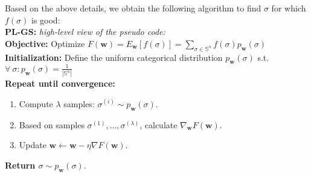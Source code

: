 \documentclass[a4paper,10pt]{article}
\begin{document}
	Based on the above details, we obtain the following algorithm to find $\sigma$ for which $f(\sigma)$ is good:\\
	\textbf{PL-GS:} \textit{high-level view of the pseudo code:} \\
	\textbf{Objective:} Optimize $F(\mathbf{w}) = E_\mathbf{w}[f(\sigma)] = \sum_{\sigma \in \mathbb{S}^n} f(\sigma) p_\mathbf{w}(\sigma)$ \\	
	\textbf{Initialization:} Define the uniform categorical distribution $p_\mathbf{w}(\sigma)$ s.t. $\forall~\sigma: p_\mathbf{w}(\sigma)=\frac{1}{|\mathbb{S}^n|}$ \\	
	\textbf{Repeat until convergence:}
	\begin{enumerate}
		\item Compute $\lambda$ samples: $\sigma^{(i)} \sim p_\mathbf{w}(\sigma)$.
		\item Based on samples $\sigma^{(1)}, \dots, \sigma^{(\lambda)}$, calculate $\nabla_{\mathbf{w}} F\left(\mathbf{w}\right)$.
		\item Update $\mathbf{w} \leftarrow \mathbf{w} - \eta \nabla F\left(\mathbf{w}\right)$.
	\end{enumerate}
	\textbf{Return $\sigma \sim p_\mathbf{w}(\sigma)$}.
	
\end{document}
